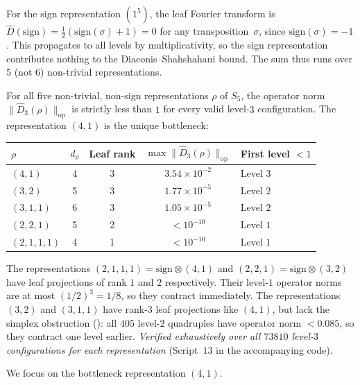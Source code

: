 \documentclass[version=submission]{iacrcc}
\newcommand{\norm}[1]{\lVert #1 \rVert}
\newcommand{\opn}[1]{\norm{#1}_{\mathrm{op}}}
\newcommand{\Dhat}{\widehat{D}}
\begin{document}
\begin{remark}
\label{rem:sign}
For the sign representation $(1^5)$, the leaf Fourier transform is
$\Dhat(\mathrm{sign}) = \frac{1}{2}(\mathrm{sign}(\sigma) + 1) = 0$
for any transposition~$\sigma$, since $\mathrm{sign}(\sigma) = -1$.
This propagates to all levels by multiplicativity, so the sign
representation contributes nothing to the Diaconis--Shahshahani bound.
The sum thus runs over $5$ (not $6$) non-trivial representations.
\end{remark}

\begin{proposition}
\label{prop:other_reps}
For all five non-trivial, non-sign representations $\rho$ of $S_5$, the
operator norm $\opn{\Dhat_3(\rho)}$ is strictly less than $1$ for every
valid level-$3$ configuration. The representation $(4,1)$ is the unique
bottleneck:
\begin{center}
\begin{tabular}{lcccl}
\toprule
$\rho$ & $d_\rho$ & Leaf rank & $\max\opn{\Dhat_3(\rho)}$ & First level $< 1$ \\
\midrule
$(4,1)$     & 4 & 3 & $3.54 \times 10^{-2}$ & Level $3$ \\
$(3,2)$     & 5 & 3 & $1.77 \times 10^{-5}$ & Level $2$ \\
$(3,1,1)$   & 6 & 3 & $1.05 \times 10^{-5}$ & Level $2$ \\
$(2,2,1)$   & 5 & 2 & $< 10^{-10}$          & Level $1$ \\
$(2,1,1,1)$ & 4 & 1 & $< 10^{-10}$          & Level $1$ \\
\bottomrule
\end{tabular}
\end{center}
The representations $(2,1,1,1) = \mathrm{sign} \otimes (4,1)$ and
$(2,2,1) = \mathrm{sign} \otimes (3,2)$ have leaf projections of rank $1$
and $2$ respectively. Their level-$1$ operator norms are at most $(1/2)^3 = 1/8$,
so they contract immediately. The representations $(3,2)$ and $(3,1,1)$
have rank-$3$ leaf projections like $(4,1)$, but lack the simplex
obstruction (): all $405$ level-$2$ quadruples have
operator norm $< 0.085$, so they contract one level earlier.
\emph{Verified exhaustively over all $73810$ level-$3$ configurations
for each representation} (Script~$13$ in the accompanying code).
\end{proposition}

We focus on the bottleneck representation $(4,1)$.
\end{document}
